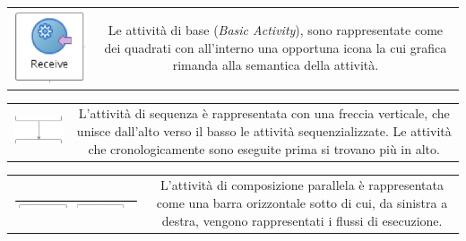\begin{tabular}{c c}
\hline
\parbox[c][3.2cm][c]{0.2 \textwidth}
{\includegraphics[scale=0.80]{blide/dia/BlideInv}} &
\parbox[c][3.2cm][c]{0.6 \textwidth}{Le attività di base (\emph{Basic
Activity}), sono rappresentate come dei quadrati con all'interno una opportuna
icona la cui grafica rimanda alla semantica della attività.}\\
\end{tabular}

\begin{tabular}{c c}
\hline
\parbox[c][3cm][c]{0.2 \textwidth}
{\includegraphics[scale=0.95]{blide/dia/BlideSec}} &
\parbox[c][3cm][c]{0.6 \textwidth}{L'attività di sequenza è rappresentata con
una freccia verticale, che unisce dall'alto verso il basso le attività
sequenzializzate. Le attività che cronologicamente sono eseguite prima si
trovano più in alto.}\\
\end{tabular}

\begin{tabular}{c c}
\hline
\parbox[c][2cm][c]{0.2 \textwidth}{
\includegraphics[scale=0.40]{blide/dia/BlideFlow}} 
&
\parbox[c][2cm][c]{0.6 \textwidth}{L'attività di composizione parallela è
rappresentata come una barra orizzontale sotto di cui, da sinistra a destra,
vengono rappresentati i flussi di esecuzione.}\\
\end{tabular}


